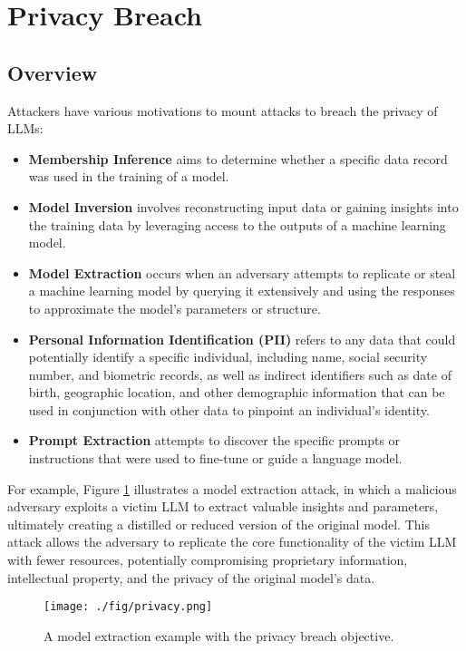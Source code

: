 \section{Privacy Breach} \label{sec:privacy}

\subsection{Overview}

Attackers have various motivations to mount attacks to breach the privacy of LLMs:
\begin{itemize}
    \item{\bf Membership Inference} aims to determine whether a specific data record was used in the training of a model.

    \item{\bf Model Inversion} involves reconstructing input data or gaining insights into the training data by leveraging access to the outputs of a machine learning model. 

    \item{\bf Model Extraction} occurs when an adversary attempts to replicate or steal a machine learning model by querying it extensively and using the responses to approximate the model's parameters or structure.

    \item{\bf Personal Information Identification (PII)} refers to any data that could potentially identify a specific individual, including name, social security number, and biometric records, as well as indirect identifiers such as date of birth, geographic location, and other demographic information that can be used in conjunction with other data to pinpoint an individual's identity. 

    \item{\bf Prompt Extraction} attempts to discover the specific prompts or instructions that were used to fine-tune or guide a language model. 
\end{itemize}
For example, Figure \ref{fig:privacy} illustrates a model extraction attack, in which a malicious adversary exploits a victim LLM to extract valuable insights and parameters, ultimately creating a distilled or reduced version of the original model. This attack allows the adversary to replicate the core functionality of the victim LLM with fewer resources, potentially compromising proprietary information, intellectual property, and the privacy of the original model’s data. 

\begin{figure}[!h]
	\centering
	\texttt{[image: ./fig/privacy.png]}
	\caption{A model extraction example with the privacy breach objective.}
	\label{fig:privacy}
\end{figure}

